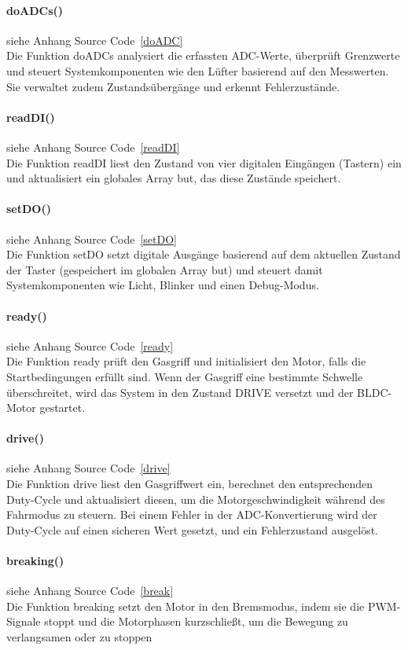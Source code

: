 \documentclass[paper=a4,11pt]{scrreprt}
\begin{document}
\paragraph{\textbf{doADCs()}} siehe Anhang Source Code~\ref{doADC}\\
Die Funktion doADCs analysiert die erfassten ADC-Werte, überprüft Grenzwerte und steuert Systemkomponenten wie den Lüfter basierend auf den Messwerten. Sie verwaltet zudem Zustandsübergänge und erkennt Fehlerzustände.
\paragraph{\textbf{readDI()}} siehe Anhang Source Code~\ref{readDI}\\
Die Funktion readDI liest den Zustand von vier digitalen Eingängen (Tastern) ein und aktualisiert ein globales Array but, das diese Zustände speichert.
\paragraph{\textbf{setDO()}} siehe Anhang Source Code~\ref{setDO}\\
Die Funktion setDO setzt digitale Ausgänge basierend auf dem aktuellen Zustand der Taster (gespeichert im globalen Array but) und steuert damit Systemkomponenten wie Licht, Blinker und einen Debug-Modus.
\paragraph{\textbf{ready()}} siehe Anhang Source Code~\ref{ready}\\
Die Funktion ready prüft den Gasgriff und initialisiert den Motor, falls die Startbedingungen erfüllt sind. Wenn der Gasgriff eine bestimmte Schwelle überschreitet, wird das System in den Zustand DRIVE versetzt und der BLDC-Motor gestartet.
\paragraph{\textbf{drive()}} siehe Anhang Source Code~\ref{drive}\\
Die Funktion drive liest den Gasgriffwert ein, berechnet den entsprechenden Duty-Cycle und aktualisiert diesen, um die Motorgeschwindigkeit während des Fahrmodus zu steuern. Bei einem Fehler in der ADC-Konvertierung wird der Duty-Cycle auf einen sicheren Wert gesetzt, und ein Fehlerzustand ausgelöst.
\paragraph{\textbf{breaking()}} siehe Anhang Source Code~\ref{break}\\
Die Funktion breaking setzt den Motor in den Bremsmodus, indem sie die PWM-Signale stoppt und die Motorphasen kurzschließt, um die Bewegung zu verlangsamen oder zu stoppen
\end{document}
